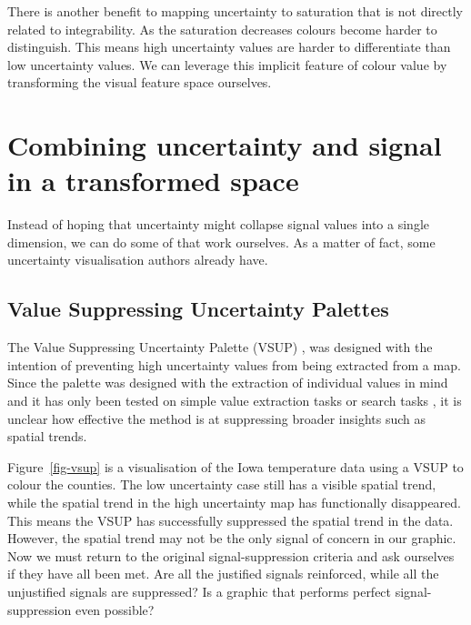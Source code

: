 \documentclass[
  12pt]{article}
\begin{document}
There is another benefit to mapping uncertainty to saturation that is
not directly related to integrability. As the saturation decreases
colours become harder to distinguish. This means high uncertainty values
are harder to differentiate than low uncertainty values. We can leverage
this implicit feature of colour value by transforming the visual feature
space ourselves.

\section{Combining uncertainty and signal in a transformed
space}\label{combining-uncertainty-and-signal-in-a-transformed-space}

Instead of hoping that uncertainty might collapse signal values into a
single dimension, we can do some of that work ourselves. As a matter of
fact, some uncertainty visualisation authors already have.

\subsection{Value Suppressing Uncertainty
Palettes}\label{value-suppressing-uncertainty-palettes}

The Value Suppressing Uncertainty Palette (VSUP) \citep{Correll2018},
was designed with the intention of preventing high uncertainty values
from being extracted from a map. Since the palette was designed with the
extraction of individual values in mind and it has only been tested on
simple value extraction tasks \citep{Correll2018} or search tasks
\citep{Ndlovu2023}, it is unclear how effective the method is at
suppressing broader insights such as spatial trends.

Figure~\ref{fig-vsup} is a visualisation of the Iowa temperature data
using a VSUP to colour the counties. The low uncertainty case still has
a visible spatial trend, while the spatial trend in the high uncertainty
map has functionally disappeared. This means the VSUP has successfully
suppressed the spatial trend in the data. However, the spatial trend may
not be the only signal of concern in our graphic. Now we must return to
the original signal-suppression criteria and ask ourselves if they have
all been met. Are all the justified signals reinforced, while all the
unjustified signals are suppressed? Is a graphic that performs perfect
signal-suppression even possible?
\end{document}
